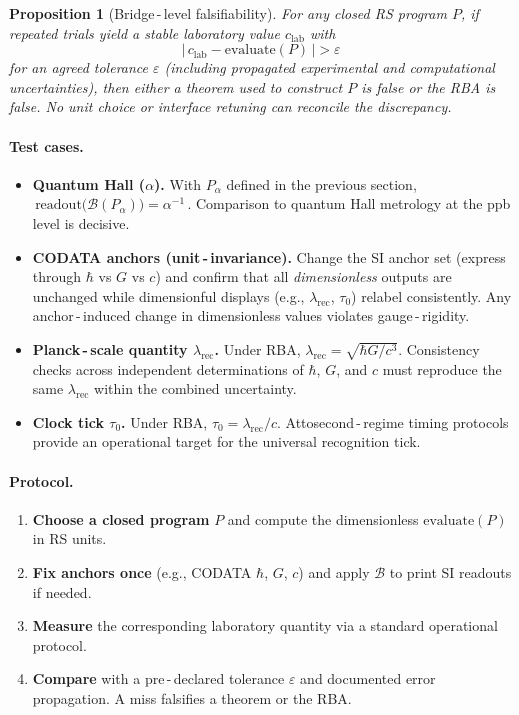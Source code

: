\documentclass[11pt]{article}
\newcommand{\lamrec}{\lambda_{\mathrm{rec}}}
\newcommand{\tauzero}{\tau_{0}}
\newtheorem{proposition}[theorem]{Proposition}
\theoremstyle{remark}
\begin{document}
\begin{proposition}[Bridge\,\mbox{-}\,level falsifiability]
For any closed RS program $P$, if repeated trials yield a stable laboratory value $c_{\mathrm{lab}}$ with
\[
  \bigl|\,c_{\mathrm{lab}} - \text{evaluate}(P)\,\bigr| > \varepsilon
\]
for an agreed tolerance $\varepsilon$ (including propagated experimental and computational uncertainties), then either a theorem used to construct $P$ is false \emph{or} the RBA is false. No unit choice or interface retuning can reconcile the discrepancy.
\end{proposition}

\paragraph{Test cases.}
\begin{itemize}
  \item \textbf{Quantum Hall (\boldmath$\alpha$).} With $P_{\alpha}$ defined in the previous section,
  \(\,\text{readout}\bigl(\mathcal B(P_{\alpha})\bigr) = \alpha^{-1}\,\). Comparison to quantum Hall metrology at the ppb level is decisive.

  \item \textbf{CODATA anchors (unit\,\mbox{-}\,invariance).} Change the SI anchor set (express through $\hbar$ vs $G$ vs $c$) and confirm that all \emph{dimensionless} outputs are unchanged while dimensionful displays (e.g., $\lamrec$, $\tauzero$) relabel consistently. Any anchor\,\mbox{-}\,induced change in dimensionless values violates gauge\,\mbox{-}\,rigidity.

  \item \textbf{Planck\,\mbox{-}\,scale quantity \boldmath$\lamrec$.} Under RBA, \(\lamrec = \sqrt{\hbar G/ c^{3}}\). Consistency checks across independent determinations of $\hbar$, $G$, and $c$ must reproduce the same $\lamrec$ within the combined uncertainty.

  \item \textbf{Clock tick \boldmath$\tauzero$.} Under RBA, \(\tauzero = \lamrec/ c\). Attosecond\,\mbox{-}\,regime timing protocols provide an operational target for the universal recognition tick.
\end{itemize}

\paragraph{Protocol.}
\begin{enumerate}
  \item \textbf{Choose a closed program} $P$ and compute the dimensionless \(\text{evaluate}(P)\) in RS units.
  \item \textbf{Fix anchors once} (e.g., CODATA $\hbar$, $G$, $c$) and apply $\mathcal B$ to print SI readouts if needed.
  \item \textbf{Measure} the corresponding laboratory quantity via a standard operational protocol.
  \item \textbf{Compare} with a pre\,\mbox{-}\,declared tolerance $\varepsilon$ and documented error propagation. A miss falsifies a theorem or the RBA.
\end{enumerate}
\end{document}
